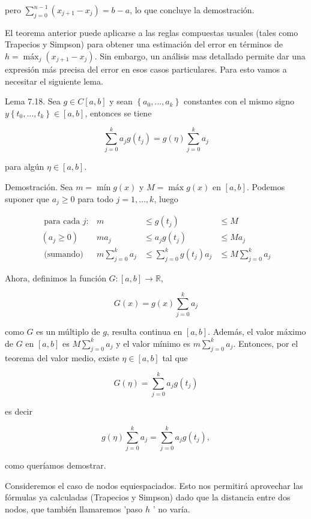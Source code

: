 \documentclass[10pt]{article}
\begin{document}
pero $\sum_{j=0}^{n-1}\left(x_{j+1}-x_{j}\right)=b-a$, lo que concluye la demostración.

El teorema anterior puede aplicarse a las reglas compuestas usuales (tales como Trapecios y Simpson) para obtener una estimación del error en términos de $h=\operatorname{máx}_{j}\left(x_{j+1}-x_{j}\right)$. Sin embargo, un análisis mas detallado permite dar una expresión más precisa del error en esos casos particulares. Para esto vamos a necesitar el siguiente lema.

Lema 7.18. Sea $g \in C[a, b]$ y sean $\left\{a_{0}, \ldots, a_{k}\right\}$ constantes con el mismo signo $y\left\{t_{0}, \ldots, t_{k}\right\} \in [a, b]$, entonces se tiene

$$
\sum_{j=0}^{k} a_{j} g\left(t_{j}\right)=g(\eta) \sum_{j=0}^{k} a_{j}
$$

para algún $\eta \in[a, b]$.

Demostración. Sea $m=\operatorname{mín} g(x)$ y $M=\operatorname{máx} g(x)$ en $[a, b]$. Podemos suponer que $a_{j} \geq 0$ para todo $j=1, \ldots, k$, luego

$$
\begin{aligned}
\text { para cada } j: & m & \leq g\left(t_{j}\right) & \leq M \\
\left(a_{j} \geq 0\right) & m a_{j} & \leq a_{j} g\left(t_{j}\right) & \leq M a_{j} \\
\text { (sumando) } & m \sum_{j=0}^{k} a_{j} & \leq \sum_{j=0}^{k} g\left(t_{j}\right) a_{j} & \leq M \sum_{j=0}^{k} a_{j}
\end{aligned}
$$

Ahora, definimos la función $G:[a, b] \rightarrow \mathbb{R}$,

$$
G(x)=g(x) \sum_{j=0}^{k} a_{j}
$$

como $G$ es un múltiplo de $g$, resulta continua en $[a, b]$. Además, el valor máximo de $G$ en $[a, b]$ es $M \sum_{j=0}^{k} a_{j}$ y el valor mínimo es $m \sum_{j=0}^{k} a_{j}$. Entonces, por el teorema del valor medio, existe $\eta \in[a, b]$ tal que

$$
G(\eta)=\sum_{j=0}^{k} a_{j} g\left(t_{j}\right)
$$

es decir

$$
g(\eta) \sum_{j=0}^{k} a_{j}=\sum_{j=0}^{k} a_{j} g\left(t_{j}\right),
$$

como queríamos demostrar.

Consideremos el caso de nodos equiespaciados. Esto nos permitirá aprovechar las fórmulas ya calculadas (Trapecios y Simpson) dado que la distancia entre dos nodos, que también llamaremos 'paso $h$ ' no varía.
\end{document}
